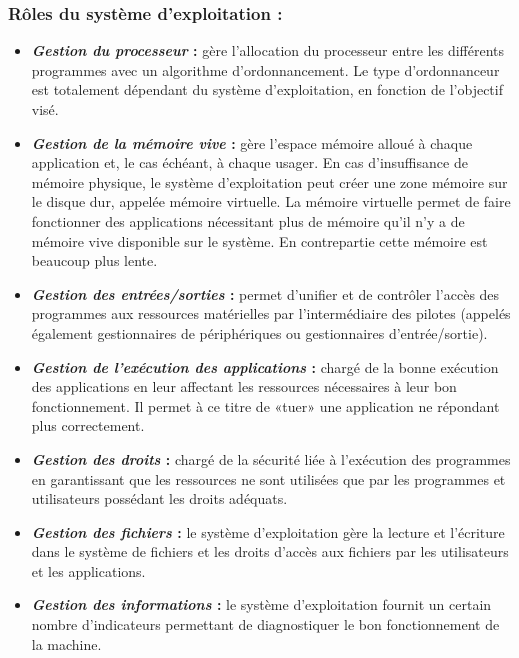 		\subsubsection*{Rôles du système d'exploitation :}
			\begin{itemize}
				\item \textbf{\textit{Gestion du processeur }:} gère l'allocation du processeur entre les différents programmes avec un algorithme d'ordonnancement. Le type d'ordonnanceur est totalement dépendant du système d'exploitation, en fonction de l'objectif visé.
				\item \textbf{\textit{Gestion de la mémoire vive }:} gère l'espace mémoire alloué à chaque application et, le cas échéant, à chaque usager. En cas d'insuffisance de mémoire physique, le système d'exploitation peut créer une zone mémoire sur le disque dur, appelée mémoire virtuelle. La mémoire virtuelle permet de faire fonctionner des applications nécessitant plus de mémoire qu'il n'y a de mémoire vive disponible sur le système. En contrepartie cette mémoire est beaucoup plus lente.
				\item \textbf{\textit{Gestion des entrées/sorties }:} permet d'unifier et de contrôler l'accès des programmes aux ressources matérielles par l'intermédiaire des pilotes (appelés également gestionnaires de périphériques ou gestionnaires d'entrée/sortie).
				\item \textbf{\textit{Gestion de l'exécution des applications }:} chargé de la bonne exécution des applications en leur affectant les ressources nécessaires à leur bon fonctionnement. Il permet à ce titre de «tuer» une application ne répondant plus correctement.
				\item \textbf{\textit{Gestion des droits }:} chargé de la sécurité liée à l'exécution des programmes en garantissant que les ressources ne sont utilisées que par les programmes et utilisateurs possédant les droits adéquats.
				\item \textbf{\textit{Gestion des fichiers }:} le système d'exploitation gère la lecture et l'écriture dans le système de fichiers et les droits d'accès aux fichiers par les utilisateurs et les applications.
				\item \textbf{\textit{Gestion des informations }:} le système d'exploitation fournit un certain nombre d'indicateurs permettant de diagnostiquer le bon fonctionnement de la machine.
			\end{itemize}
		
